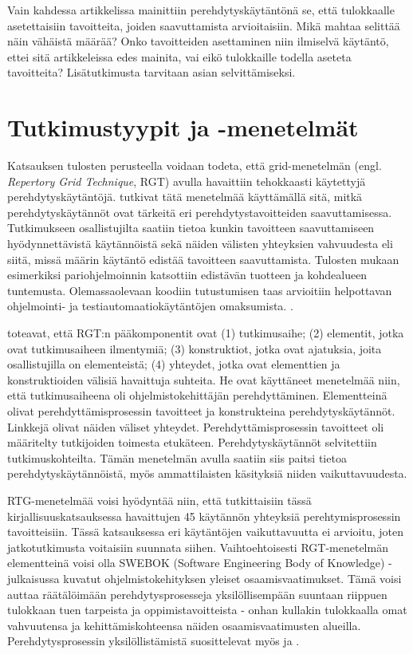 \documentclass[utf8]{gradu3}
\begin{document}
Vain kahdessa artikkelissa mainittiin perehdytyskäytäntönä se, että tulokkaalle asetettaisiin tavoitteita, joiden saavuttamista arvioitaisiin. Mikä mahtaa selittää näin vähäistä määrää? Onko tavoitteiden asettaminen niin ilmiselvä käytäntö, ettei sitä artikkeleissa edes mainita, vai eikö tulokkaille todella aseteta tavoitteita? Lisätutkimusta tarvitaan asian selvittämiseksi.

\section{Tutkimustyypit ja -menetelmät}

Katsauksen tulosten perusteella voidaan todeta, että grid-menetelmän (engl. \textit{Repertory Grid Technique}, RGT) avulla havaittiin tehokkaasti käytettyjä perehdytyskäytäntöjä. \textcite{buchan-ym-2019} tutkivat tätä menetelmää käyttämällä sitä, mitkä perehdytyskäytännöt ovat tärkeitä eri perehdytystavoitteiden saavuttamisessa. Tutkimukseen osallistujilta saatiin tietoa kunkin tavoitteen saavuttamiseen hyödynnettävistä käytännöistä sekä näiden välisten yhteyksien vahvuudesta eli siitä, missä määrin käytäntö edistää tavoitteen saavuttamista. Tulosten mukaan esimerkiksi pariohjelmoinnin katsottiin edistävän tuotteen ja kohdealueen tuntemusta. Olemassaolevaan koodiin tutustumisen taas arvioitiin helpottavan ohjelmointi- ja testiautomaatiokäytäntöjen omaksumista. \parencite{buchan-ym-2019}.

\textcite{buchan-ym-2019} toteavat, että RGT:n pääkomponentit ovat (1) tutkimusaihe; (2) elementit, jotka ovat tutkimusaiheen ilmentymiä; (3) konstruktiot, jotka ovat ajatuksia, joita osallistujilla on elementeistä; (4) yhteydet, jotka ovat elementtien ja konstruktioiden välisiä havaittuja suhteita. He ovat  käyttäneet menetelmää niin, että tutkimusaiheena oli ohjelmistokehittäjän perehdyttäminen. Elementteinä olivat perehdyttämisprosessin tavoitteet ja konstrukteina perehdytyskäytännöt. Linkkejä olivat näiden väliset yhteydet. Perehdyttämisprosessin tavoitteet oli määritelty tutkijoiden toimesta etukäteen. Perehdytyskäytännöt selvitettiin tutkimuskohteilta. Tämän menetelmän avulla saatiin siis paitsi tietoa perehdytyskäytännöistä, myös ammattilaisten käsityksiä niiden vaikuttavuudesta. 

RTG-menetelmää voisi hyödyntää niin, että tutkittaisiin tässä kirjallisuuskatsauksessa havaittujen 45 käytännön yhteyksiä perehtymisprosessin tavoitteisiin. Tässä katsauksessa eri käytäntöjen vaikuttavuutta ei arvioitu, joten jatkotutkimusta voitaisiin suunnata siihen. Vaihtoehtoisesti RGT-menetelmän elementteinä voisi olla SWEBOK (Software Engineering Body of Knowledge) -julkaisussa \parencite{swebok} kuvatut ohjelmistokehityksen yleiset osaamisvaatimukset. Tämä voisi auttaa räätälöimään perehdytysprosesseja yksilöllisempään suuntaan riippuen tulokkaan tuen tarpeista ja oppimistavoitteista - onhan kullakin tulokkaalla omat vahvuutensa ja kehittämiskohteensa näiden osaamisvaatimusten alueilla. Perehdytysprosessin yksilöllistämistä suosittelevat myös \textcite{britto-ym-2017} ja \textcite{rodeghero-ym-2021}.
\end{document}
